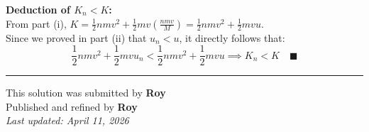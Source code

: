 \documentclass[12pt]{article}
\begin{document}
\textbf{Deduction of $K_n < K$:} \\
From part (i), $K = \frac{1}{2}nmv^2 + \frac{1}{2}mv \left( \frac{nmv}{M} \right) = \frac{1}{2}nmv^2 + \frac{1}{2}mvu$. \\
Since we proved in part (ii) that $u_n < u$, it directly follows that:
\begin{equation*}
    \frac{1}{2}nmv^2 + \frac{1}{2}mvu_n < \frac{1}{2}nmv^2 + \frac{1}{2}mvu \implies K_n < K \quad \blacksquare
\end{equation*}

\hrule
\begin{center}
    This solution was submitted by \textbf{Roy}\\[4pt]
    Published and refined by \textbf{Roy}\\[8pt]
	\textit{Last updated: April 11, 2026}
\end{center}
\end{document}
